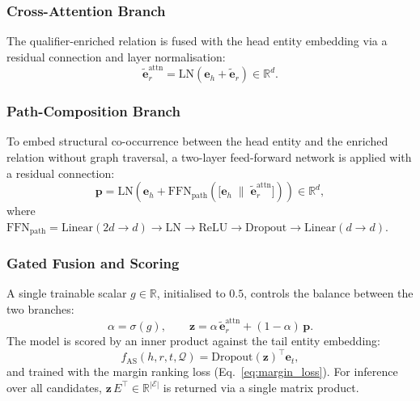 \documentclass[10pt,journal,compsoc]{IEEEtran}
\begin{document}
\subsubsection{Cross-Attention Branch}
\label{sssec:as_attn}

The qualifier-enriched relation is fused with the head
entity embedding via a residual connection and layer
normalisation:
\begin{equation}
  \tilde{\mathbf{e}}_r^{\mathrm{attn}}
  = \mathrm{LN}\!\left(
      \mathbf{e}_h + \tilde{\mathbf{e}}_r
    \right) \in \mathbb{R}^d.
  \label{eq:as_attn}
\end{equation}

\subsubsection{Path-Composition Branch}
\label{sssec:as_path}

To embed structural co-occurrence between the head entity
and the enriched relation without graph traversal, a
two-layer feed-forward network is applied with a
residual connection:
\begin{equation}
  \mathbf{p}
  = \mathrm{LN}\!\left(
      \mathbf{e}_h
      + \mathrm{FFN}_{\mathrm{path}}\!\left(
          \bigl[\mathbf{e}_h
          \;\|\;
          \tilde{\mathbf{e}}_r^{\mathrm{attn}}\bigr]
        \right)
    \right) \in \mathbb{R}^d,
  \label{eq:as_path}
\end{equation}
where
$\mathrm{FFN}_{\mathrm{path}} =
 \mathrm{Linear}(2d{\to}d)
 \to \mathrm{LN}
 \to \mathrm{ReLU}
 \to \mathrm{Dropout}
 \to \mathrm{Linear}(d{\to}d)$.

\subsubsection{Gated Fusion and Scoring}
\label{sssec:as_gate}

A single trainable scalar $g \in \mathbb{R}$,
initialised to $0.5$, controls the balance between
the two branches:
\begin{equation}
  \alpha = \sigma(g), \qquad
  \mathbf{z}
  = \alpha\,\tilde{\mathbf{e}}_r^{\mathrm{attn}}
    + (1{-}\alpha)\,\mathbf{p}.
  \label{eq:as_gate}
\end{equation}
The model is scored by an inner product against the tail
entity embedding:
\begin{equation}
  f_{\mathrm{AS}}(h,r,t,\mathcal{Q})
  = \mathrm{Dropout}(\mathbf{z})^{\top} \mathbf{e}_t,
  \label{eq:as_score}
\end{equation}
and trained with the margin ranking loss
(Eq.~\ref{eq:margin_loss}).
For inference over all candidates,
$\mathbf{z}\,E^{\top} \in \mathbb{R}^{|\mathcal{E}|}$
is returned via a single matrix product.
\end{document}

